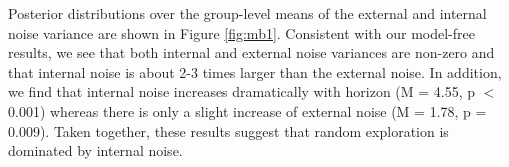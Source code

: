 \documentclass[12pt]{article}
\begin{document}
	Posterior distributions over the group-level means of the external and internal noise variance are shown in Figure \ref{fig:mb1}. Consistent with our model-free results, we see that both internal and external noise variances are non-zero and that internal noise is about 2-3 times larger than the external noise. In addition, we find that internal noise increases dramatically with horizon (M = 4.55, p $<$ 0.001) whereas there is only a slight increase of external noise (M = 1.78, p = 0.009).  Taken together, these results suggest that random exploration is dominated by internal noise.
	
	
	
	
	
	
\end{document}
